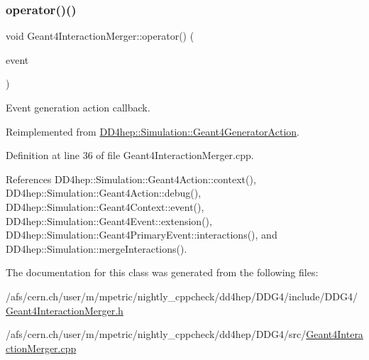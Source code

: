 \subsubsection{\texorpdfstring{operator()()}{operator()()}}
{\footnotesize\ttfamily void Geant4\+Interaction\+Merger\+::operator() (\begin{DoxyParamCaption}\item[{G4\+Event $\ast$}]{event }\end{DoxyParamCaption})\hspace{0.3cm}{\ttfamily [virtual]}}



Event generation action callback. 



Reimplemented from \hyperlink{class_d_d4hep_1_1_simulation_1_1_geant4_generator_action_ac5a1d2335a19e3f9d555081199e01801}{D\+D4hep\+::\+Simulation\+::\+Geant4\+Generator\+Action}.



Definition at line 36 of file Geant4\+Interaction\+Merger.\+cpp.



References D\+D4hep\+::\+Simulation\+::\+Geant4\+Action\+::context(), D\+D4hep\+::\+Simulation\+::\+Geant4\+Action\+::debug(), D\+D4hep\+::\+Simulation\+::\+Geant4\+Context\+::event(), D\+D4hep\+::\+Simulation\+::\+Geant4\+Event\+::extension(), D\+D4hep\+::\+Simulation\+::\+Geant4\+Primary\+Event\+::interactions(), and D\+D4hep\+::\+Simulation\+::merge\+Interactions().



The documentation for this class was generated from the following files\+:\begin{DoxyCompactItemize}
\item 
/afs/cern.\+ch/user/m/mpetric/nightly\+\_\+cppcheck/dd4hep/\+D\+D\+G4/include/\+D\+D\+G4/\hyperlink{_geant4_interaction_merger_8h}{Geant4\+Interaction\+Merger.\+h}\item 
/afs/cern.\+ch/user/m/mpetric/nightly\+\_\+cppcheck/dd4hep/\+D\+D\+G4/src/\hyperlink{_geant4_interaction_merger_8cpp}{Geant4\+Interaction\+Merger.\+cpp}\end{DoxyCompactItemize}
